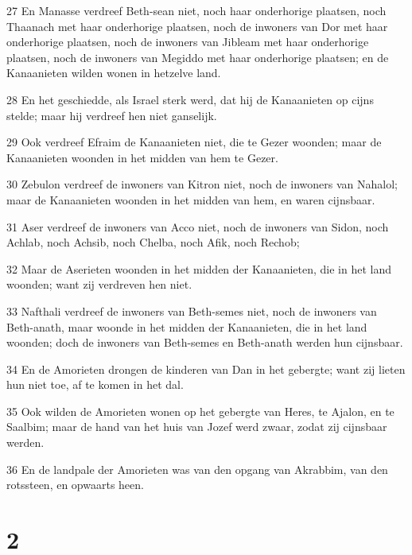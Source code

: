 \par 27 En Manasse verdreef Beth-sean niet, noch haar onderhorige plaatsen, noch Thaanach met haar onderhorige plaatsen, noch de inwoners van Dor met haar onderhorige plaatsen, noch de inwoners van Jibleam met haar onderhorige plaatsen, noch de inwoners van Megiddo met haar onderhorige plaatsen; en de Kanaanieten wilden wonen in hetzelve land.
\par 28 En het geschiedde, als Israel sterk werd, dat hij de Kanaanieten op cijns stelde; maar hij verdreef hen niet ganselijk.
\par 29 Ook verdreef Efraim de Kanaanieten niet, die te Gezer woonden; maar de Kanaanieten woonden in het midden van hem te Gezer.
\par 30 Zebulon verdreef de inwoners van Kitron niet, noch de inwoners van Nahalol; maar de Kanaanieten woonden in het midden van hem, en waren cijnsbaar.
\par 31 Aser verdreef de inwoners van Acco niet, noch de inwoners van Sidon, noch Achlab, noch Achsib, noch Chelba, noch Afik, noch Rechob;
\par 32 Maar de Aserieten woonden in het midden der Kanaanieten, die in het land woonden; want zij verdreven hen niet.
\par 33 Nafthali verdreef de inwoners van Beth-semes niet, noch de inwoners van Beth-anath, maar woonde in het midden der Kanaanieten, die in het land woonden; doch de inwoners van Beth-semes en Beth-anath werden hun cijnsbaar.
\par 34 En de Amorieten drongen de kinderen van Dan in het gebergte; want zij lieten hun niet toe, af te komen in het dal.
\par 35 Ook wilden de Amorieten wonen op het gebergte van Heres, te Ajalon, en te Saalbim; maar de hand van het huis van Jozef werd zwaar, zodat zij cijnsbaar werden.
\par 36 En de landpale der Amorieten was van den opgang van Akrabbim, van den rotssteen, en opwaarts heen.

\chapter{2}

